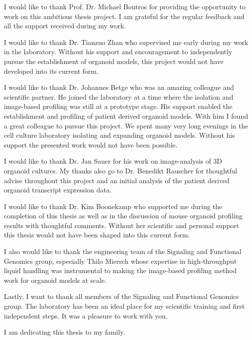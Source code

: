 I would like to thank Prof. Dr. Michael Boutros for providing the opportunity to work on this ambitious thesis project. I am grateful for the regular feedback and all the support received during my work.


I would like to thank Dr. Tianzuo Zhan who supervised me early during my work in the laboratory. Without his support and encouragement to independently pursue the establishment of organoid models, this project would not have developed into its current form.  

I would like to thank Dr. Johannes Betge who was an amazing colleague and scientific partner. He joined the laboratory at a time where the isolation and image-based profiling was still at a  prototype stage. His support enabled the establishment and profiling of patient derived organoid models. With him I found a great colleague to pursue this project. We spent many very long evenings in the cell culture laboratory isolating and expanding organoid models. Without his support the presented work would not have been possible. 

I would like to thank Dr. Jan Sauer for his work on image-analysis of 3D organoid cultures. My thanks also go to Dr. Benedikt Rauscher for thoughtful advise throughout this project and an initial analysis of the patient derived organoid transcript expression data.  

I would like to thank Dr. Kim Boonekamp who supported me during the completion of this thesis as well as in the discussion of mouse organoid profiling results with thoughtful comments. Without her scientific and personal support this thesis would not have been shaped into this current form.

I also would like to thank the engineering team of the Signaling and Functional Genomics group, especially Thilo Miersch whose expertise in high-throughput liquid handling was instrumental to making the image-based profiling method work for organoid models at scale. 

Lastly, I want to thank all members of the Signaling and Functional Genomics group. The laboratory has been an ideal place for my scientific training and first independent steps. It was a pleasure to work with you. 

I am dedicating this thesis to my family.